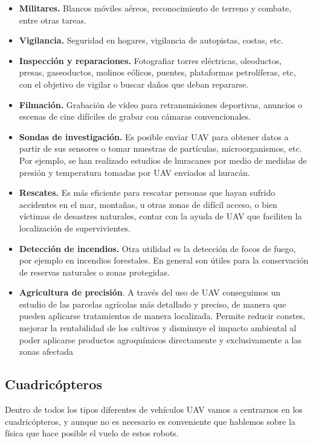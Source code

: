 \begin{itemize}
 \item \textbf{Militares.} Blancos móviles aéreos, reconocimiento de terreno y combate, entre otras tareas. 
 \item \textbf{Vigilancia.} Seguridad en hogares, vigilancia de autopistas, costas, etc. 
 \item \textbf{Inspección y reparaciones.} Fotografiar torres eléctricas, oleoductos, presas, gaseoductos, molinos eólicos, puentes, plataformas petrolíferas, etc, con el objetivo de vigilar o buscar daños que deban repararse.
 \item \textbf{Filmación.} Grabación de vídeo para retransmisiones deportivas, anuncios o escenas de cine difíciles de grabar con cámaras convencionales.
 \item \textbf{Sondas de investigación.} Es posible enviar UAV para obtener datos a partir de sus sensores o tomar muestras de partículas, microorganismos, etc. Por ejemplo, se han realizado estudios de huracanes por medio de medidas de presión y temperatura tomadas por UAV enviados al huracán.
 \item \textbf{Rescates.} Es más eficiente para rescatar personas que hayan sufrido accidentes en el mar, montañas, u otras zonas de difícil acceso, o bien víctimas de desastres naturales, contar con la ayuda de UAV que faciliten la localización de supervivientes.
 \item \textbf{Detección de incendios.} Otra utilidad es la detección de focos de fuego, por ejemplo en incendios forestales. En general son útiles para la conservación de reservas naturales o zonas protegidas.
 \item \textbf{Agricultura de precisión}. A través del uso de UAV conseguimos un estudio de las parcelas agrícolas más detallado y preciso, de manera que pueden aplicarse tratamientos de manera localizada. Permite reducir constes, mejorar la rentabilidad de los cultivos y disminuye el impacto ambiental al poder aplicarse productos agroquímicos directamente y exclusivamente a las zonas afectada
\end{itemize}


\subsection{Cuadricópteros}\label{sec:quadrotors}

Dentro de todos los tipos diferentes de vehículos UAV vamos a centrarnos en los cuadricópteros, y aunque no es necesario es conveniente que hablemos sobre la física que hace posible el vuelo de estos robots.\\

